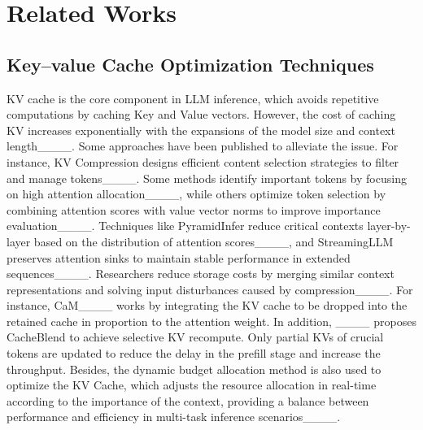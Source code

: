 \section{Related Works}
\subsection{Key--value Cache Optimization Techniques}

KV cache is the core component in LLM inference, which avoids repetitive computations by caching Key and Value vectors. However, the cost of caching KV increases exponentially with the expansions of the model size and context length____. Some approaches have been published to alleviate the issue. For instance, KV Compression designs efficient content selection strategies to filter and manage tokens____. Some methods identify important tokens by focusing on high attention allocation____, while others optimize token selection by combining attention scores with value vector norms to improve importance evaluation____. Techniques like PyramidInfer reduce critical contexts layer-by-layer based on the distribution of attention scores____, and StreamingLLM preserves attention sinks to maintain stable performance in extended sequences____. Researchers reduce storage costs by merging similar context representations and solving input disturbances caused by compression____. For instance, CaM____ works by integrating the KV cache to be dropped into the retained cache in proportion to the attention weight.  In addition, ____ proposes CacheBlend to achieve selective KV recompute. Only partial KVs of crucial tokens are updated to reduce the delay in the prefill stage and increase the throughput. Besides, the dynamic budget allocation method is also used to optimize the KV Cache, which adjusts the resource allocation in real-time according to the importance of the context, providing a balance between performance and efficiency in multi-task inference scenarios____.



